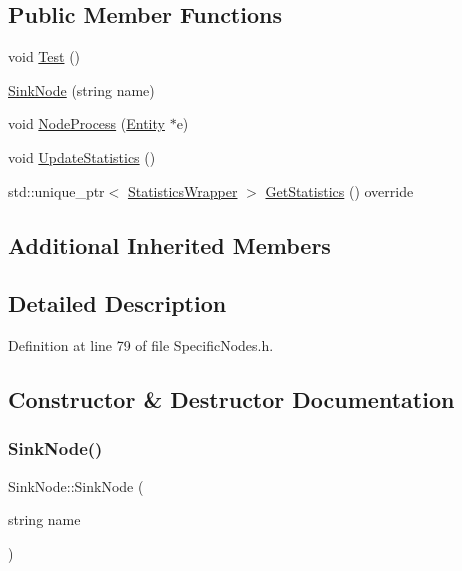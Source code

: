 \subsection*{Public Member Functions}
\begin{DoxyCompactItemize}
\item 
void \hyperlink{class_sink_node_adffbd13ea7f32f79b585b7a8955d1d45}{Test} ()
\item 
\hyperlink{class_sink_node_a0c3227da9d4ca0757f3512e4473c9b5c}{Sink\+Node} (string name)
\item 
void \hyperlink{class_sink_node_a5f3fe2c195c3bb154f27bdf3ae27dd27}{Node\+Process} (\hyperlink{class_entity}{Entity} $\ast$e)
\item 
void \hyperlink{class_sink_node_adf5f0001fd1d3d61725ff6a6f5b40ba7}{Update\+Statistics} ()
\item 
std\+::unique\+\_\+ptr$<$ \hyperlink{class_generic_node_1_1_statistics_wrapper}{Statistics\+Wrapper} $>$ \hyperlink{class_sink_node_ad6aeb0857d3ddd9511cd5d24974e1fac}{Get\+Statistics} () override
\end{DoxyCompactItemize}
\subsection*{Additional Inherited Members}


\subsection{Detailed Description}


Definition at line 79 of file Specific\+Nodes.\+h.



\subsection{Constructor \& Destructor Documentation}
\mbox{\label{class_sink_node_a0c3227da9d4ca0757f3512e4473c9b5c}} 
\subsubsection{\texorpdfstring{Sink\+Node()}{SinkNode()}}
{\footnotesize\ttfamily Sink\+Node\+::\+Sink\+Node (\begin{DoxyParamCaption}\item[{string}]{name }\end{DoxyParamCaption})}



